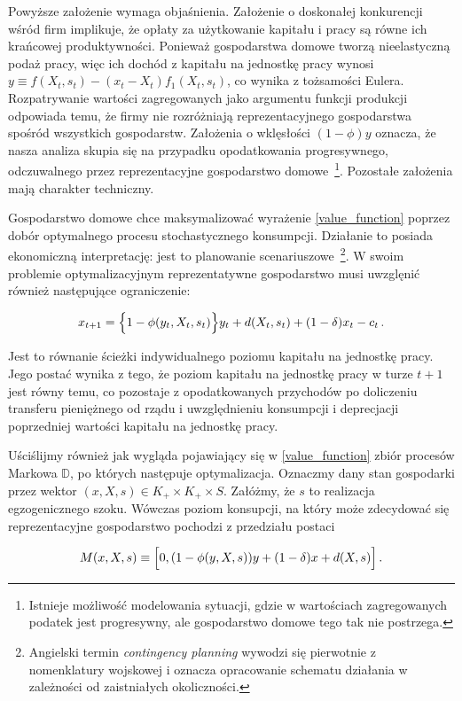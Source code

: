 Powyższe założenie wymaga objaśnienia. Założenie o doskonałej konkurencji wśród firm implikuje, że opłaty za użytkowanie kapitału i pracy są równe ich krańcowej produktywności. Ponieważ gospodarstwa domowe tworzą nieelastyczną podaż pracy, więc ich dochód z kapitału na jednostkę pracy wynosi $ y \equiv f(X_t, s_t) - (x_t - X_t)f_1 (X_t, s_t) $, co wynika z tożsamości Eulera. Rozpatrywanie wartości zagregowanych jako argumentu funkcji produkcji odpowiada temu, że firmy nie rozróżniają reprezentacyjnego gospodarstwa spośród wszystkich gospodarstw. Założenia o wklęsłości $ (1 - \phi)y $ oznacza, że nasza analiza skupia się na przypadku opodatkowania progresywnego, odczuwalnego przez reprezentacyjne gospodarstwo domowe~\footnote{Istnieje możliwość modelowania sytuacji, gdzie w wartościach zagregowanych podatek jest progresywny, ale gospodarstwo domowe tego tak nie postrzega.}. Pozostałe założenia mają charakter techniczny.

Gospodarstwo domowe chce maksymalizować wyrażenie \ref{value_function} poprzez dobór optymalnego procesu stochastycznego konsumpcji. Działanie to posiada ekonomiczną interpretację: jest to planowanie scenariuszowe~\footnote{Angielski termin {\it contingency planning} wywodzi się pierwotnie z nomenklatury wojskowej i oznacza opracowanie schematu działania w zależności od zaistniałych okoliczności.}. W swoim problemie optymalizacyjnym reprezentatywne gospodarstwo musi uwzglęnić również następujące ograniczenie:

$$ x_{t+1} = \Bigl\{ 1 - \phi(y_t, X_t, s_t) \Bigl\}y_t + d(X_t, s_t) + (1 - \delta)x_t  - c_t \,.$$

Jest to równanie ścieżki indywidualnego poziomu kapitału na jednostkę pracy. Jego postać wynika z tego, że poziom kapitału na jednostkę pracy w turze $ t+1 $ jest równy temu, co pozostaje z opodatkowanych przychodów po doliczeniu transferu pieniężnego od rządu i uwzględnieniu konsumpcji i deprecjacji poprzedniej wartości kapitału na jednostkę pracy.

Uściślijmy również jak wygląda pojawiający się w \ref{value_function} zbiór procesów Markowa $ \mathbb{D} $, po których następuje optymalizacja. Oznaczmy dany stan gospodarki przez wektor $ (x, X, s) \in K_{+} \times K_{+} \times S $. Załóżmy, że $ s $ to realizacja egzogenicznego szoku. Wówczas poziom konsupcji, na który może zdecydować się reprezentacyjne gospodarstwo pochodzi z przedziału postaci

\begin{equation*}
	M(x, X, s) \equiv \Bigl[ 0, (1 - \phi(y, X,s))y + (1-\delta)x + d(X,s) \Bigl]\,.
\end{equation*}

